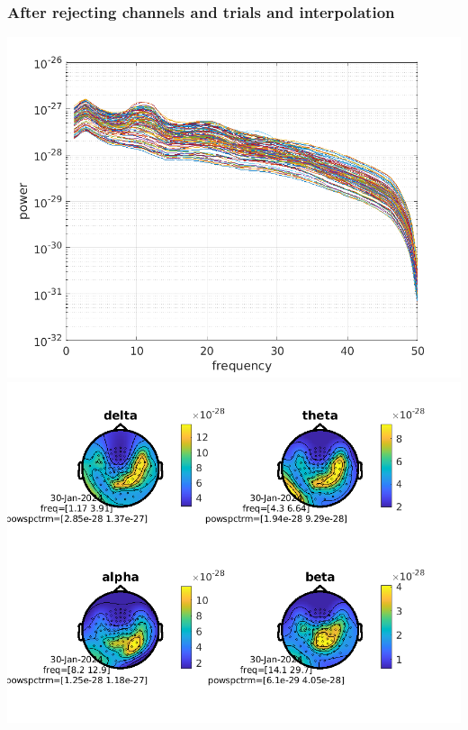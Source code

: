\documentclass[10pt,a4paper,oneside]{report}
\begin{document}
\subsubsection*{After rejecting channels and trials and interpolation}
\includegraphics[width=14cm]{spectrum_after_rej_mag.png}\\
\includegraphics[width=14cm]{topo_after_rej_mag.png}\\
\end{document}
